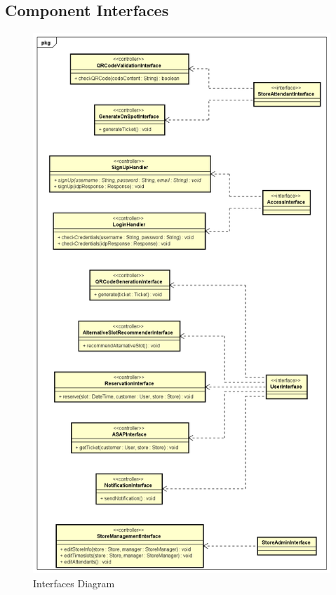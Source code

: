 \documentclass[table, 12pt]{article}
\begin{document}
\subsection{Component Interfaces}
\begin{figure}[H]
    \begin{center}
        \includegraphics[scale=0.35]{assets/Interfaces/Interface-Diagram.png}
        \caption{Interfaces Diagram}
        \label{interfaces_diagram}
    \end{center}
\end{figure}
\end{document}
